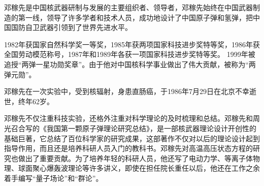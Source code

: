 \documentclass[UTF8]{ctexart}
\begin{document}
邓稼先是中国核武器研制与发展的主要组织者、领导者，邓稼先始终在中国武器制造的第一线，领导了许多学者和技术人员，成功地设计了中国原子弹和氢弹，把中国国防自卫武器引领到了世界先进水平。

1982年获国家自然科学奖一等奖，1985年获两项国家科技进步奖特等奖，1986年获全国劳动模范称号，1987年和1989年各获一项国家科技进步奖特等奖。  1999年被追授“两弹一星功勋奖章”。由于他对中国核科学事业做出了伟大贡献，被称为“两弹元勋”。

邓稼先在一次实验中，受到核辐射，身患直肠癌，于1986年7月29日在北京不幸逝世，终年62岁。

邓稼先不仅注重科技实验，还格外注重对科学理论的及时梳理和总结。邓稼先和周光召合写的《我国第一颗原子弹理论研究总结》，是一部核武器理论设计开创性的基础巨著，它总结了百位科学家的研究成果，这部著作不仅对以后的理论设计起到指导作用，而且还是培养科研人员入门的教科书。邓稼先对高温高压状态方程的研究也做出了重要贡献。为了培养年轻的科研人员，他还写了电动力学、等离子体物理、球面聚心爆轰波理论等许多讲义，即使在担任院长重任以后，他还在工作之余着手编写“量子场论”和“群论”。
\end{document}
